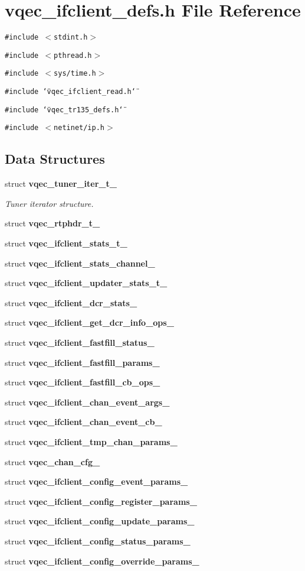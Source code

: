 \section{vqec\_\-ifclient\_\-defs.h File Reference}
\label{vqec__ifclient__defs_8h}
{\tt \#include $<$stdint.h$>$}\par
{\tt \#include $<$pthread.h$>$}\par
{\tt \#include $<$sys/time.h$>$}\par
{\tt \#include \char`\"{}vqec\_\-ifclient\_\-read.h\char`\"{}}\par
{\tt \#include \char`\"{}vqec\_\-tr135\_\-defs.h\char`\"{}}\par
{\tt \#include $<$netinet/ip.h$>$}\par
\subsection*{Data Structures}
\begin{CompactItemize}
\item 
struct \bf{vqec\_\-tuner\_\-iter\_\-t\_\-}
\begin{CompactList}\small\item\em Tuner iterator structure. \item\end{CompactList}\item 
struct \bf{vqec\_\-rtphdr\_\-t\_\-}
\item 
struct \bf{vqec\_\-ifclient\_\-stats\_\-t\_\-}
\item 
struct \bf{vqec\_\-ifclient\_\-stats\_\-channel\_\-}
\item 
struct \bf{vqec\_\-ifclient\_\-updater\_\-stats\_\-t\_\-}
\item 
struct \bf{vqec\_\-ifclient\_\-dcr\_\-stats\_\-}
\item 
struct \bf{vqec\_\-ifclient\_\-get\_\-dcr\_\-info\_\-ops\_\-}
\item 
struct \bf{vqec\_\-ifclient\_\-fastfill\_\-status\_\-}
\item 
struct \bf{vqec\_\-ifclient\_\-fastfill\_\-params\_\-}
\item 
struct \bf{vqec\_\-ifclient\_\-fastfill\_\-cb\_\-ops\_\-}
\item 
struct \bf{vqec\_\-ifclient\_\-chan\_\-event\_\-args\_\-}
\item 
struct \bf{vqec\_\-ifclient\_\-chan\_\-event\_\-cb\_\-}
\item 
struct \bf{vqec\_\-ifclient\_\-tmp\_\-chan\_\-params\_\-}
\item 
struct \bf{vqec\_\-chan\_\-cfg\_\-}
\item 
struct \bf{vqec\_\-ifclient\_\-config\_\-event\_\-params\_\-}
\item 
struct \bf{vqec\_\-ifclient\_\-config\_\-register\_\-params\_\-}
\item 
struct \bf{vqec\_\-ifclient\_\-config\_\-update\_\-params\_\-}
\item 
struct \bf{vqec\_\-ifclient\_\-config\_\-status\_\-params\_\-}
\item 
struct \bf{vqec\_\-ifclient\_\-config\_\-override\_\-params\_\-}
\end{CompactItemize}
